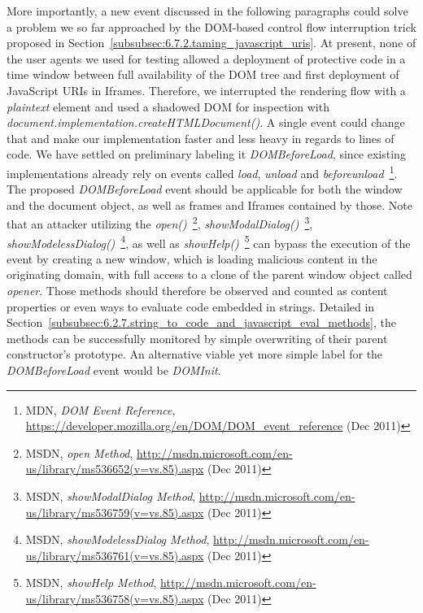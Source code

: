     More importantly, a new event discussed in the following paragraphs could solve a problem we so far approached by the DOM-based control flow interruption trick proposed in Section~\ref{subsubsec:6.7.2.taming_javascript_uris}. At present, none of the user agents we used for testing allowed a deployment of protective code in a time window between full availability of the DOM tree and first deployment of JavaScript URIs in Iframes. Therefore, we interrupted the rendering flow with a \textit{plaintext} element and used a shadowed DOM for inspection with \textit{document.implementation.createHTMLDocument()}. A single event could change that and make our implementation faster and less heavy in regards to lines of code. We have settled on preliminary labeling it \textit{DOMBeforeLoad}, since existing implementations already rely on events called \textit{load}, \textit{unload} and \textit{beforeunload}~\footnote{MDN, \textit{DOM Event Reference}, \url{https://developer.mozilla.org/en/DOM/DOM\_event\_reference} (Dec 2011)}.\\

    The proposed \textit{DOMBeforeLoad} event should be applicable for both the window and the document object, as well as frames and Iframes contained by those. Note that an attacker utilizing the \textit{open()}~\footnote{MSDN, \textit{open Method}, \url{http://msdn.microsoft.com/en-us/library/ms536652(v=vs.85).aspx} (Dec 2011)}, \textit{showModalDialog()}~\footnote{MSDN, \textit{showModalDialog Method}, \url{http://msdn.microsoft.com/en-us/library/ms536759(v=vs.85).aspx} (Dec 2011)}, \textit{showModelessDialog()}~\footnote{MSDN, \textit{showModelessDialog Method}, \url{http://msdn.microsoft.com/en-us/library/ms536761(v=vs.85).aspx} (Dec 2011)}, as well as \textit{showHelp()}~\footnote{MSDN, \textit{showHelp Method}, \url{http://msdn.microsoft.com/en-us/library/ms536758(v=vs.85).aspx} (Dec 2011)} can bypass the execution of the event by creating a new window, which is loading malicious content in the originating domain, with full access to a clone of the parent window object called \textit{opener}. Those methods should therefore be observed and counted as content properties or even ways to evaluate code embedded in strings. Detailed in Section~\ref{subsubsec:6.2.7.string_to_code_and_javascript_eval_methods}, the methods can be successfully monitored by simple overwriting of their parent constructor's prototype. An alternative viable yet more simple label for the \textit{DOMBeforeLoad} event would be \textit{DOMInit}.
    

